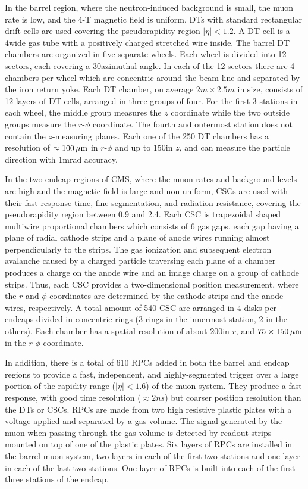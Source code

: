 In the barrel region, where the neutron-induced background is small, the muon rate is low, and the 4-T magnetic field is uniform, DTs with standard rectangular drift cells are used covering the pseudorapidity region $|\eta| < 1.2$. A DT cell is a 4\cm wide gas tube with a positively charged stretched wire inside. 
The barrel DT chambers are organized in five separate wheels. Each wheel is divided into 12 sectors, each covering a 30\de azimuthal angle. In each of the 12 sectors there are 4 chambers per wheel which are concentric around the beam line and separated by the iron return yoke. Each DT chamber, on average $2\unit{m}\times2.5\unit{m}$ in size, consists of 12 layers of DT cells, arranged in three groups of four. For the first 3 stations in each wheel, the middle group measures the $z$ coordinate while the two outside groups measure the $r$-$\phi$ coordinate. The fourth and outermost station does not contain the $z$-measuring planes. Each one of the 250 DT chambers has a resolution of $\approx100\,\mu\text{m}$ in $r$-$\phi$ and up to 150\mum in $z$, and can measure the particle direction with 1\unit{mrad} accuracy.

In the two endcap regions of CMS, where the muon rates and background levels are high and the magnetic field is large and non-uniform, CSCs are used with their fast response time, fine segmentation, and radiation resistance, covering the pseudorapidity region between 0.9 and 2.4. 
Each CSC is trapezoidal shaped multiwire proportional chambers which consists of 6 gas gaps, each gap having a plane of radial cathode strips and a plane of anode wires running almost perpendicularly to the strips. The gas ionization and subsequent electron avalanche caused by a charged particle traversing each plane of a chamber produces a charge on the anode wire and an image charge on a group of cathode strips. Thus, each CSC provides a two-dimensional position measurement, where the $r$ and $\phi$ coordinates are determined by the cathode strips and the anode wires, respectively. A total amount of 540 CSC are arranged in 4 disks per endcaps divided in concentric rings (3 rings in the innermost station, 2 in the others). Each chamber has a spatial resolution of about 200\mm in $r$, and $75\times150\,\mu\text{m}$ in the $r$-$\phi$ coordinate.

In addition, there is a total of 610 RPCs added in both the barrel and endcap regions to provide a fast, independent, and highly-segmented trigger over a large portion of the rapidity range ($|\eta| < 1.6$) of the muon system. They produce a fast response, with good time resolution ($\approx2\unit{ns}$) but coarser position resolution than the DTs or CSCs. RPCs are made from two high resistive plastic plates with a voltage applied and separated by a gas volume. The signal generated by the muon when passing through the gas volume is detected by readout strips mounted on top of one of the plastic plates. Six layers of RPCs are installed in the barrel muon system, two layers in each of the first two stations and one layer in each of the last two stations. One layer of RPCs is built into each of the first three stations of the endcap.

